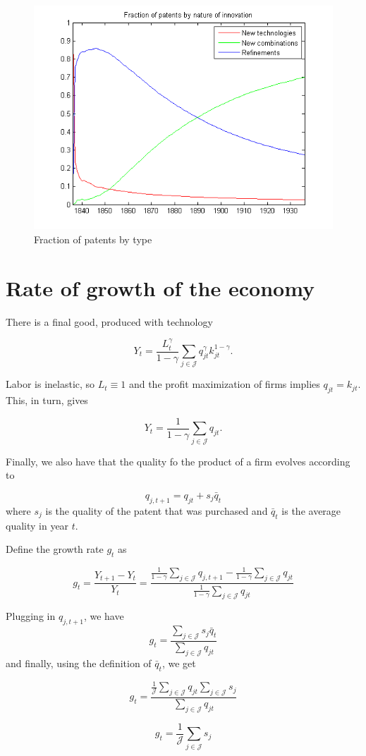 \documentclass[a4paper,11pt]{article}
\begin{document}
\begin{figure}
\begin{center}
\includegraphics[scale=.8]{fractions.png}
\caption{Fraction of patents by type}
\end{center}
\end{figure}

\clearpage

\section*{Rate of growth of the economy}

There is a final good, produced with technology

\[ Y_t = \frac{L_t^{\gamma}}{1-\gamma}\sum_{j \in \mathcal{J}} q_{jt}^{\gamma}k_{jt}^{1-\gamma}. \]

Labor is inelastic, so $L_t \equiv 1$ and the profit maximization of firms implies $q_{jt} = k_{jt}$. This, in turn, gives

\[ Y_t = \frac{1}{1-\gamma}\sum_{j \in \mathcal{J}}q_{jt}. \]

Finally, we also have that the quality fo the product of a firm evolves according to

\[ q_{j,t+1} = q_{jt} + s_j\bar{q}_t \]
where $s_j$ is the quality of the patent that was purchased and $\bar{q}_t$ is the average quality in year $t$. 

Define the growth rate $g_t$ as

\[ g_t = \frac{Y_{t+1} - Y_t}{Y_t} = \frac{\frac{1}{1-\gamma}\sum_{j \in \mathcal{J}}q_{j,t+1} - \frac{1}{1-\gamma}\sum_{j \in \mathcal{J}}q_{jt}}{\frac{1}{1-\gamma}\sum_{j \in \mathcal{J}}q_{jt}} \]

Plugging in $q_{j, t+1}$, we have
\[ g_t = \frac{\sum_{j \in \mathcal{J}}s_j \bar{q}_t}{\sum_{j \in \mathcal{J}}q_{jt}} \]
and finally, using the definition of $\bar{q}_t$, we get

\[ g_t = \frac{\frac{1}{\mathcal{J}}\sum_{j \in \mathcal{J}}q_{jt}\sum_{j \in \mathcal{J}}s_j}{\sum_{j \in \mathcal{J}}q_{jt}} \]

\[ g_t = \frac{1}{\mathcal{J}}\sum_{j \in \mathcal{J}}s_j \]
\end{document}
